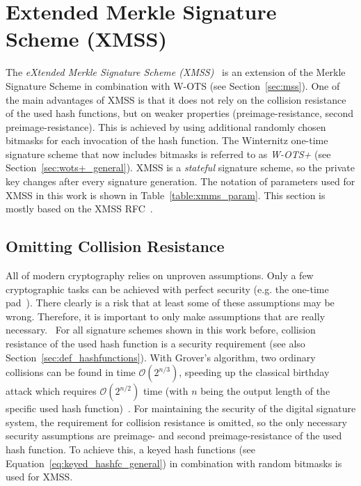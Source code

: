 \section{Extended Merkle Signature Scheme (XMSS)}
\label{sec:xmss}
The \textit{eXtended Merkle Signature Scheme (XMSS)}~\cite{xmss_RFC8391} is an extension of the Merkle Signature Scheme in combination with W-OTS (see Section~\ref{sec:mss}). One of the main advantages of XMSS is that it does not rely on the collision resistance of the used hash functions, but on weaker properties (preimage-resistance, second preimage-resistance). This is achieved by using additional randomly chosen bitmasks for each invocation of the hash function.
The Winternitz one-time signature scheme that now includes bitmasks is referred to as \textit{W-OTS+} (see Section~\ref{sec:wots+_general}). XMSS is a \textit{stateful} signature scheme, so the private key changes after every signature generation. The notation of parameters used for XMSS in this work is shown in Table~\ref{table:xmms_param}. This section is mostly based on the XMSS RFC~\cite{xmss_RFC8391}.

\subsection{Omitting Collision Resistance}
\label{sec:omit_coll_res}
All of modern cryptography relies on unproven assumptions. Only a few cryptographic tasks can be achieved with perfect security (e.g. the one-time pad~\cite{one_time_pad_2013}). There clearly is a risk that at least some of these assumptions may be wrong. Therefore, it is important to only make assumptions that are really necessary.~\cite{minimal_security_assump_phd_2016}
For all signature schemes shown in this work before, collision resistance of the used hash function is a security requirement (see also Section~\ref{sec:def_hashfunctions}). 
With Grover’s algorithm, two ordinary collisions can be found in time $\mathcal{O}(2^{n/3})$, speeding up the classical birthday attack which requires $\mathcal{O}(2^{n/2})$ time (with $n$ being the output length of the specific used hash function)~\cite{colission_complexity_reduction_quantum_2019, birthday_attack_quantum_collision_1998}. %
For maintaining the security of the digital signature system, the requirement for collision resistance is omitted, so the only necessary security assumptions are preimage- and second preimage-resistance of the used hash function.
To achieve this, a keyed hash functions (see Equation~\ref{eq:keyed_hashfc_general}) in combination with random bitmasks is used for XMSS. %


